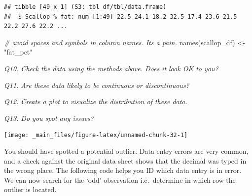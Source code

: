 \documentclass[
  11pt,
  a4paper,
]{book}
\newenvironment{Shaded}{\begin{snugshade}}{\end{snugshade}}
\newcommand{\AttributeTok}[1]{\textcolor[rgb]{0.77,0.63,0.00}{#1}}
\newcommand{\CommentTok}[1]{\textcolor[rgb]{0.56,0.35,0.01}{\textit{#1}}}
\newcommand{\ConstantTok}[1]{\textcolor[rgb]{0.00,0.00,0.00}{#1}}
\newcommand{\DecValTok}[1]{\textcolor[rgb]{0.00,0.00,0.81}{#1}}
\newcommand{\FunctionTok}[1]{\textcolor[rgb]{0.00,0.00,0.00}{#1}}
\newcommand{\NormalTok}[1]{#1}
\newcommand{\OtherTok}[1]{\textcolor[rgb]{0.56,0.35,0.01}{#1}}
\newcommand{\SpecialCharTok}[1]{\textcolor[rgb]{0.00,0.00,0.00}{#1}}
\newcommand{\StringTok}[1]{\textcolor[rgb]{0.31,0.60,0.02}{#1}}
\begin{document}
\begin{verbatim}
## tibble [49 x 1] (S3: tbl_df/tbl/data.frame)
##  $ Scallop % fat: num [1:49] 22.5 24.1 18.2 32.5 17.4 23.6 21.5 22.2 27.6 22.2 ...
\end{verbatim}

\begin{Shaded}
\begin{Highlighting}[]
\CommentTok{\# avoid spaces and symbols in column names. It\textquotesingle{}s a pain.}
\FunctionTok{names}\NormalTok{(scallop\_df) }\OtherTok{\textless{}{-}} \StringTok{"fat\_pct"}
\end{Highlighting}
\end{Shaded}

\emph{Q10. Check the data using the methods above. Does it look OK to you?}

\emph{Q11. Are these data likely to be continuous or discontinuous?}

\emph{Q12. Create a plot to visualize the distribution of these data.}

\emph{Q13. Do you spot any issues?}

\begin{Shaded}
\end{Shaded}

\begin{center}\texttt{[image: \_main\_files/figure-latex/unnamed-chunk-32-1]} \end{center}

You should have spotted a potential outlier. Data entry errors are very common, and a check against the original data sheet shows that the decimal was typed in the wrong place. The following code helps you ID which data entry is in error. We can now search for the `odd' observation i.e.~determine in which row the outlier is located.

\begin{Shaded}
\end{Shaded}
\end{document}
